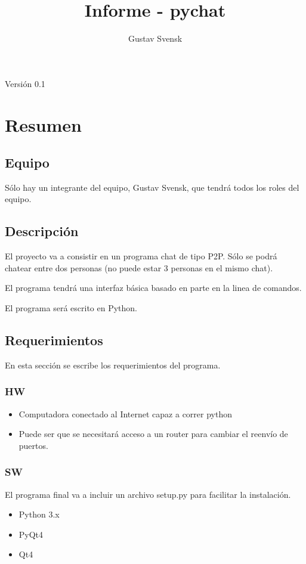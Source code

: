 \documentclass[a4paper, 12pt]{article}
\title{Informe - pychat}
\author{Gustav Svensk}
\begin{document}
\cfoot{\thepage}
\renewcommand{\headrulewidth}{0.4pt}


\maketitle
\thispagestyle{empty}
\begin{center}
        {\large Versión 0.1}
\end{center}
\newpage

\setcounter{page}{1}
\tableofcontents
\listoftables
\listoffigures
\newpage

\section{Resumen}
\subsection{Equipo}
Sólo hay un integrante del equipo, Gustav Svensk, que tendrá todos los roles del
equipo.
\subsection{Descripción}
El proyecto va a consistir en un programa chat de tipo P2P. Sólo se
podrá chatear entre dos personas (no puede estar 3 personas en el mismo
chat).

El programa tendrá una interfaz básica basado en parte en la linea de comandos.

El programa será escrito en Python.
\subsection{Requerimientos}
En esta sección se escribe los requerimientos del programa.
\subsubsection{HW}
\begin{itemize}
        \item Computadora conectado al Internet capaz a correr python
        \item Puede ser que se necesitará acceso a un router para cambiar el
                reenvío de puertos.
\end{itemize}
\subsubsection{SW}
El programa final va a incluir un archivo setup.py para facilitar la
instalación.
\begin{itemize}
        \item Python 3.x
        \item PyQt4
        \item Qt4
\end{itemize}
\end{document}
